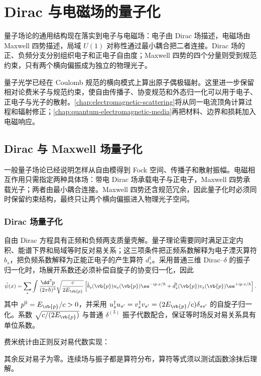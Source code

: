 \chapter{Dirac 与电磁场的量子化}\label{chap:qed}

量子场论的通用结构现在落实到电子与电磁场：电子由 Dirac 场描述，电磁场由 Maxwell 四势描述，局域 $U(1)$ 对称性通过最小耦合把二者连接。Dirac 场的正、负频分支分别组织电子和正电子自由度；Maxwell 四势的四个分量则受到规范约束，只有两个横向偏振成为独立的物理光子。

量子光学已经在 Coulomb 规范的横向模式上算出原子偶极辐射。这里进一步保留相对论费米子与规范约束，使自由传播子、协变规范和外态归一化可以用于电子、正电子与光子的散射。\cref{chap:electromagnetic-scattering}将从同一电流顶角计算过程和辐射修正；\cref{chap:quantum-electromagnetic-media}再把材料、边界和损耗加入电磁响应。

\section{Dirac 与 Maxwell 场量子化}

一般量子场论已经说明怎样从自由模得到 Fock 空间、传播子和散射振幅。电磁相互作用只需指定两种具体场：带电 Dirac 场承载电子与正电子，Maxwell 四势承载光子；两者由最小耦合连接。Maxwell 四势还含规范冗余，因此量子化时必须同时保留约束结构，最终只让两个横向偏振进入物理光子空间。

\subsection{Dirac 场量子化}

\begin{definition}
自由 Dirac 方程具有正频和负频两支质量壳解。量子理论需要同时满足正定内积、能谱下界和局域等时反对易关系；这三项条件把正频系数解释为电子湮灭算符 $b_s$，把负频系数解释为正能正电子的产生算符 $d_s^\dagger$。采用普通三维 Dirac--$\delta$ 的振子归一化时，场展开系数还必须补偿自旋子的协变归一化，因此
\begin{equation}
{
\hat\psi(x)
=\sum_s\int\frac{\dd^3 p}{(2\pi\hbar)^3}\sqrt{\frac{c}{2E_{\vb{p}}}}
\left[
\hat b_s(\vb{p})u_s(\vb{p})\ee^{-ip\cdot x/\hbar}
+\hat d_s^\dagger(\vb{p})v_s(\vb{p})\ee^{+ip\cdot x/\hbar}
\right].}
\label{eq:dirac-field-exp-r2}
\end{equation}
其中 $p^0=E_{\vb{p}}/c>0$，并采用 $u_s^\dagger u_{s'}=v_s^\dagger v_{s'}=(2E_{\vb{p}}/c)\delta_{ss'}$ 的自旋子归一化。系数 $\sqrt{c/(2E_{\vb{p}})}$ 与普通 $\delta^{(3)}$ 振子代数配合，保证等时场反对易关系具有单位系数。

费米统计由正则反对易代数实现：

其余反对易子为零。连续场与振子都是算符分布，算符等式须以测试函数涂抹后理解。
\end{definition}

